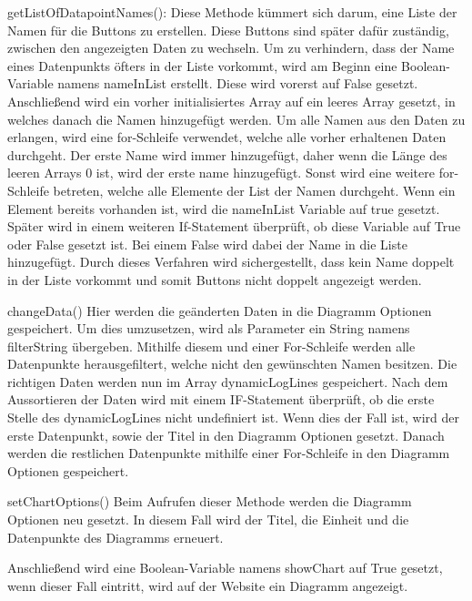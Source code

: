 \begin{compactitem}
    \item getListOfDatapointNames(): Diese Methode kümmert sich darum, eine Liste der Namen für die Buttons zu erstellen. Diese Buttons sind später dafür zuständig, zwischen den angezeigten Daten zu wechseln. 
    Um zu verhindern, dass der Name eines Datenpunkts öfters in der Liste vorkommt, wird am Beginn eine Boolean-Variable namens nameInList erstellt. Diese wird vorerst auf False gesetzt.
    Anschließend wird ein vorher initialisiertes Array auf ein leeres Array gesetzt, in welches danach die Namen hinzugefügt werden. Um alle Namen aus den Daten zu erlangen, wird eine for-Schleife verwendet, welche alle vorher erhaltenen Daten durchgeht. Der erste Name wird immer hinzugefügt, daher wenn die Länge des leeren Arrays 0 ist, wird der erste name hinzugefügt. Sonst wird eine weitere for-Schleife betreten, welche alle Elemente der List der Namen durchgeht. Wenn ein Element bereits vorhanden ist, wird die nameInList Variable auf true gesetzt. Später wird in einem weiteren If-Statement überprüft, ob diese Variable auf True oder False gesetzt ist. Bei einem False wird dabei der Name in die Liste hinzugefügt. Durch dieses Verfahren wird sichergestellt, dass kein Name doppelt in der Liste vorkommt und somit Buttons nicht doppelt angezeigt werden.    
    \item changeData()
    Hier werden die geänderten Daten in die Diagramm Optionen gespeichert. Um dies umzusetzen, wird als Parameter ein String namens filterString übergeben. Mithilfe diesem und einer For-Schleife werden alle Datenpunkte herausgefiltert, welche nicht den gewünschten Namen besitzen. Die richtigen Daten werden nun im Array dynamicLogLines gespeichert. Nach dem Aussortieren der Daten wird mit einem IF-Statement überprüft, ob die erste Stelle des dynamicLogLines nicht undefiniert ist. Wenn dies der Fall ist, wird der erste Datenpunkt, sowie der Titel in den Diagramm Optionen gesetzt. Danach werden die restlichen Datenpunkte mithilfe einer For-Schleife in den Diagramm Optionen gespeichert.               
    \item setChartOptions()
    Beim Aufrufen dieser Methode werden die Diagramm Optionen neu gesetzt. In diesem Fall wird der Titel, die Einheit und die Datenpunkte des Diagramms erneuert.        
\end{compactitem}

Anschließend wird eine Boolean-Variable namens showChart auf True gesetzt, wenn dieser Fall eintritt, wird auf der Website ein Diagramm angezeigt. 

